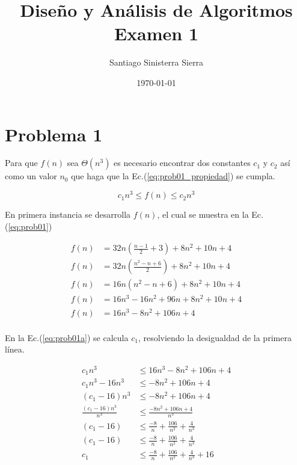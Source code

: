 \documentclass[hidelinks]{article}
\author{Santiago Sinisterra Sierra}
\title{Diseño y Análisis de Algoritmos \\ Examen 1}
\date{\today}
\begin{document}
\maketitle

\section{Problema 1}

Para que $f(n)$ sea $\Theta(n^3)$ es necesario encontrar dos constantes $c_1$ y $c_2$ así como un valor $n_0$ que haga que  la Ec.(\ref{eq:prob01_propiedad}) se cumpla.

\begin{equation}
  \label{eq:prob01_propiedad}
  c_1 n^3 \leq f(n) \leq c_2 n^3
\end{equation}

En primera instancia se desarrolla $f(n)$, el cual se muestra en la Ec.(\ref{eq:prob01})

\begin{equation}
  \label{eq:prob01}
  \begin{aligned}
    f(n) & = 32n ( \frac{n-1}{2} + 3) + 8n^2 + 10n + 4     \\
    f(n) & = 32n ( \frac{n^2 - n + 6}{2}) + 8n^2 + 10n + 4 \\
    f(n) & = 16n ( n^2 - n + 6) + 8n^2 + 10n + 4           \\
    f(n) & = 16n^3 - 16n^2 + 96n + 8n^2 + 10n + 4          \\
    f(n) & = 16n^3 - 8n^2 + 106n + 4                       \\
  \end{aligned}
\end{equation}

En la Ec.(\ref{eq:prob01a}) se calcula $c_1$, resolviendo la desigualdad de la primera línea.

\begin{equation}
  \label{eq:prob01a}
  \begin{aligned}
    c_1 n^3                    & \leq 16n^3 - 8n^2 + 106n + 4                             \\
    c_1 n^3 - 16n^3            & \leq -8n^2 + 106n + 4                                    \\
    (c_1 - 16) n^3             & \leq -8n^2 + 106n + 4                                    \\
    \frac{(c_1 - 16) n^3}{n^3} & \leq \frac{ -8n^2 + 106n + 4        }{n^3}               \\
    (c_1 - 16 )                & \leq \frac{-8}{n} + \frac{106}{n^2} + \frac{4}{n^3}      \\
    (c_1 - 16 )                & \leq \frac{-8}{n} + \frac{106}{n^2} + \frac{4}{n^3}      \\
    c_1                        & \leq \frac{-8}{n} + \frac{106}{n^2} + \frac{4}{n^3} + 16
  \end{aligned}
\end{equation}
\end{document}
